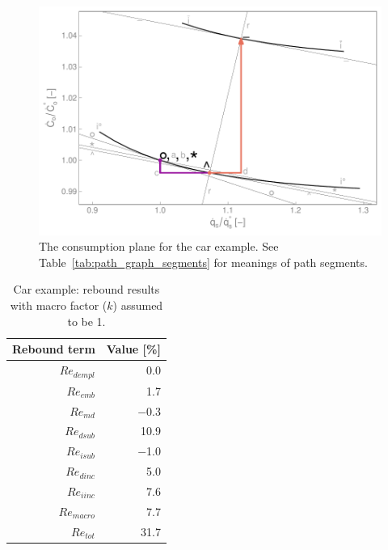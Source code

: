 \documentclass[12pt]{article}\usepackage[]{graphicx}\usepackage[]{xcolor}
\makeatletter
\def\maxwidth{ %
  \ifdim\Gin@nat@width>\linewidth
    \linewidth
  \else
    \Gin@nat@width
  \fi
}
\newenvironment{knitrout}{}{} %
\makeatother
\begin{document}
\begin{knitrout}
\color{fgcolor}\begin{figure}

{\centering \includegraphics[width=\maxwidth]{figure/CarConsGraph-1} 

}

\caption{The consumption plane for the car example. See Table~\ref{tab:path_graph_segments} for meanings of path segments.}\label{fig:CarConsGraph}
\end{figure}

\end{knitrout}



\begin{table}[ht]
\centering
\caption{Car example: rebound results with macro factor ($k$) assumed to be 1.} 
\label{tab:car_results}
\begin{tabular}{rr}
  \toprule
Rebound term & Value [\%] \\ 
  \midrule
$Re_{dempl}$ & 0.0 \\ 
  $Re_{emb}$ & 1.7 \\ 
  $Re_{md}$ & $-$0.3 \\ 
  $Re_{dsub}$ & 10.9 \\ 
  $Re_{isub}$ & $-$1.0 \\ 
  $Re_{dinc}$ & 5.0 \\ 
  $Re_{iinc}$ & 7.6 \\ 
  $Re_{macro}$ & 7.7 \\ 
   \midrule
$Re_{tot}$ & 31.7 \\ 
   \bottomrule
\end{tabular}
\end{table}
\end{document}
